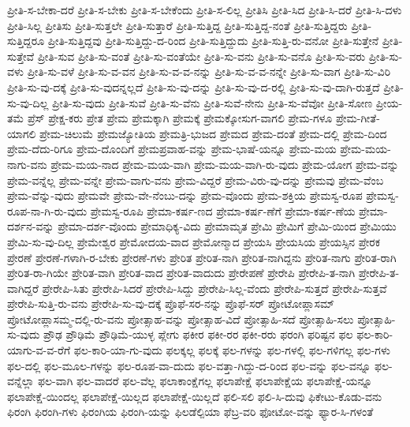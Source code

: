 {ಪ್ರೀತಿ-ಸ-ಬೇಕಾ-ದರೆ
ಪ್ರೀತಿ-ಸ-ಬೇಕು
ಪ್ರೀತಿ-ಸ-ಬೇಕೆಂದು
ಪ್ರೀತಿ-ಸ-ಲಿಲ್ಲ
ಪ್ರೀತಿಸಿ
ಪ್ರೀತಿ-ಸಿದ
ಪ್ರೀತಿ-ಸಿ-ದರೆ
ಪ್ರೀತಿ-ಸಿ-ದಳು
ಪ್ರೀತಿ-ಸಿಲ್ಲ
ಪ್ರೀತಿಸು
ಪ್ರೀತಿ-ಸುತ್ತಲೇ
ಪ್ರೀತಿ-ಸುತ್ತಾರೆ
ಪ್ರೀತಿ-ಸುತ್ತಿದ್ದ
ಪ್ರೀತಿ-ಸುತ್ತಿದ್ದ-ನಂತೆ
ಪ್ರೀತಿ-ಸುತ್ತಿದ್ದರು
ಪ್ರೀತಿ-ಸುತ್ತಿದ್ದರೂ
ಪ್ರೀತಿ-ಸುತ್ತಿದ್ದವು
ಪ್ರೀತಿ-ಸುತ್ತಿದ್ದು-ದ-ರಿಂದ
ಪ್ರೀತಿ-ಸುತ್ತಿದ್ದುದು
ಪ್ರೀತಿ-ಸುತ್ತಿ-ರು-ವನೋ
ಪ್ರೀತಿ-ಸುತ್ತೇನೆ
ಪ್ರೀತಿ-ಸುತ್ತೇವೆ
ಪ್ರೀತಿ-ಸುವ
ಪ್ರೀತಿ-ಸು-ವಂತೆ
ಪ್ರೀತಿ-ಸು-ವಂತೆಯೇ
ಪ್ರೀತಿ-ಸು-ವನು
ಪ್ರೀತಿ-ಸು-ವನೊ
ಪ್ರೀತಿ-ಸು-ವರು
ಪ್ರೀತಿ-ಸು-ವಳು
ಪ್ರೀತಿ-ಸು-ವಳೆ
ಪ್ರೀತಿ-ಸು-ವ-ವನ
ಪ್ರೀತಿ-ಸು-ವ-ವ-ನನ್ನು
ಪ್ರೀತಿ-ಸು-ವ-ವ-ನನ್ನೇ
ಪ್ರೀತಿ-ಸು-ವಾಗ
ಪ್ರೀತಿ-ಸು-ವಿರಿ
ಪ್ರೀತಿ-ಸು-ವು-ದಕ್ಕೆ
ಪ್ರೀತಿ-ಸು-ವುದನ್ನಲ್ಲದೆ
ಪ್ರೀತಿ-ಸು-ವು-ದನ್ನು
ಪ್ರೀತಿ-ಸು-ವು-ದ-ರಲ್ಲಿ
ಪ್ರೀತಿ-ಸು-ವು-ದಾಗಿ-ರುತ್ತದೆ
ಪ್ರೀತಿ-ಸು-ವು-ದಿಲ್ಲ
ಪ್ರೀತಿ-ಸು-ವುದು
ಪ್ರೀತಿ-ಸುವೆ
ಪ್ರೀತಿ-ಸು-ವೆನು
ಪ್ರೀತಿ-ಸುವೆ-ನೇನು
ಪ್ರೀತಿ-ಸು-ವೆವೋ
ಪ್ರೀತಿ-ಸೋಣ
ಪ್ರೀಯ-ತಮೆ
ಪ್ರೆಸ್
ಪ್ರೇಕ್ಷ-ಕರು
ಪ್ರೇತ
ಪ್ರೇಮ
ಪ್ರೇಮಕ್ಕಾಗಿ
ಪ್ರೇಮಕ್ಕೆ
ಪ್ರೇಮಕ್ಕೋಸುಗ-ವಾಗಲಿ
ಪ್ರೇಮ-ಗಳೂ
ಪ್ರೇಮ-ಗೀತೆ-ಯಾಗಲಿ
ಪ್ರೇಮ-ಚಿಲುಮೆ
ಪ್ರೇಮಜ್ಯೋತಿಯ
ಪ್ರೇಮತ್ರಿ-ಭುಜದ
ಪ್ರೇಮದ
ಪ್ರೇಮ-ದಂತೆ
ಪ್ರೇಮ-ದಲ್ಲಿ
ಪ್ರೇಮ-ದಿಂದ
ಪ್ರೇಮ-ದೆದು-ರಿಗೂ
ಪ್ರೇಮ-ದೊಂದಿಗೆ
ಪ್ರೇಮಪ್ರವಾಹ-ವನ್ನು
ಪ್ರೇಮ-ಭಾಷೆ-ಯನ್ನೂ
ಪ್ರೇಮ-ಮಯ
ಪ್ರೇಮ-ಮಯ-ನಾಗು-ವನು
ಪ್ರೇಮ-ಮಯ-ನಾದ
ಪ್ರೇಮ-ಮಯ-ವಾಗಿ
ಪ್ರೇಮ-ಮಯ-ವಾಗಿ-ರು-ವುದು
ಪ್ರೇಮ-ಯೋಗ
ಪ್ರೇಮ-ವನ್ನು
ಪ್ರೇಮ-ವನ್ನೆಲ್ಲ
ಪ್ರೇಮ-ವನ್ನೇ
ಪ್ರೇಮ-ವಾಗು-ವನು
ಪ್ರೇಮ-ವಿದ್ದರೆ
ಪ್ರೇಮ-ವಿರು-ವು-ದನ್ನು
ಪ್ರೇಮವು
ಪ್ರೇಮ-ವೆಂಬ
ಪ್ರೇಮ-ವೆನ್ನು-ವುದು
ಪ್ರೇಮವೇ
ಪ್ರೇಮ-ವೇ-ನೆಂಬು-ದನ್ನು
ಪ್ರೇಮ-ವೊಂದು
ಪ್ರೇಮ-ಶಕ್ತಿಯ
ಪ್ರೇಮಸ್ವ-ರೂಪ
ಪ್ರೇಮಸ್ವ-ರೂಪ-ನಾ-ಗಿ-ರು-ವುದು
ಪ್ರೇಮಸ್ವ-ರೂಪಿ
ಪ್ರೇಮಾ-ಕರ್ಷ-ಣದ
ಪ್ರೇಮಾ-ಕರ್ಷ-ಣೆಗೆ
ಪ್ರೇಮಾ-ಕರ್ಷ-ಣೆಯ
ಪ್ರೇಮಾ-ದರ್ಶನ-ವನ್ನು
ಪ್ರೇಮಾ-ದರ್ಶ-ವೊಂದು
ಪ್ರೇಮಾಧಿಕ್ಯ-ವಿದು
ಪ್ರೇಮಾಮೃತ
ಪ್ರೇಮಿ
ಪ್ರೇಮಿಗೆ
ಪ್ರೇಮಿ-ಯಿಂದ
ಪ್ರೇಮಿಯು
ಪ್ರೇಮಿ-ಸು-ವು-ದಿಲ್ಲ
ಪ್ರೇಮೇಶ್ವರ
ಪ್ರೇಮೋದಯ-ವಾದ
ಪ್ರೇಮೋನ್ಮಾದ
ಪ್ರೇಯಸಿ
ಪ್ರೇಯಸಿಯ
ಪ್ರೇಯಸ್ಸಿನ
ಪ್ರೇರಕ
ಪ್ರೇರಣೆ
ಪ್ರೇರಣೆ-ಗಳಾಗಿ-ರ-ಬೇಕು
ಪ್ರೇರಣೆ-ಗಳು
ಪ್ರೇರಿತ
ಪ್ರೇರಿತ-ನಾಗಿ
ಪ್ರೇರಿತ-ನಾಗಿದ್ದನು
ಪ್ರೇರಿತ-ನಾಗು
ಪ್ರೇರಿತ-ರಾಗಿ
ಪ್ರೇರಿತ-ರಾ-ಗಿಯೇ
ಪ್ರೇರಿತ-ವಾಗಿ
ಪ್ರೇರಿತ-ವಾದ
ಪ್ರೇರಿತ-ವಾದುದು
ಪ್ರೇರೇಪಣೆ
ಪ್ರೇರೇಪಿ
ಪ್ರೇರೇಪಿ-ತ-ನಾಗಿ
ಪ್ರೇರೇಪಿ-ತ-ವಾಗಿದ್ದರೆ
ಪ್ರೇರೇಪಿ-ಸಿತು
ಪ್ರೇರೇಪಿ-ಸಿದರೆ
ಪ್ರೇರೇಪಿ-ಸಿದ್ದು
ಪ್ರೇರೇಪಿ-ಸಿಲ್ಲ-ವೆಂದು
ಪ್ರೇರೇಪಿ-ಸುತ್ತದೆ
ಪ್ರೇರೇಪಿ-ಸುತ್ತವೆ
ಪ್ರೇರೇಪಿ-ಸುತ್ತಿ-ರು-ವನು
ಪ್ರೇರೇಪಿ-ಸು-ವು-ದಕ್ಕೆ
ಪ್ರೊಫೆ-ಸರ-ನನ್ನು
ಪ್ರೊಫೆ-ಸರ್
ಪ್ರೋಟೋಪ್ಲಾಸಮ್
ಪ್ರೋಟೋಪ್ಲಾಸಮ್ಮ-ದಲ್ಲಿ-ರು-ವನು
ಪ್ರೋತ್ಸಾಹ-ವನ್ನು
ಪ್ರೋತ್ಸಾಹ-ವಿದೆ
ಪ್ರೋತ್ಸಾಹಿ-ಸದೆ
ಪ್ರೋತ್ಸಾಹಿ-ಸಲು
ಪ್ರೋತ್ಸಾಹಿ-ಸು-ವುದು
ಪ್ರೌಢ
ಪ್ರೌಢಿಮೆ
ಪ್ರೌಢಿಮೆ-ಯುಳ್ಳ
ಪ್ಲೇಗು
ಫಕೀರ
ಫಕೀ-ರರ
ಫಕೀ-ರರು
ಫರಂಗಿ
ಫರಿಷ್ಟನ
ಫಲ
ಫಲ-ಕಾರಿ-ಯಾಗು-ವ-ವ-ರೆಗೆ
ಫಲ-ಕಾರಿ-ಯಾ-ಗು-ವುದು
ಫಲಕ್ಕಲ್ಲ
ಫಲಕ್ಕೆ
ಫಲ-ಗಳನ್ನು
ಫಲ-ಗಳಲ್ಲಿ
ಫಲ-ಗಳಿಗಲ್ಲ
ಫಲ-ಗಳು
ಫಲ-ದಲ್ಲಿ
ಫಲ-ಮೂಲ-ಗಳನ್ನು
ಫಲ-ರೂಪ-ವಾ-ದುದು
ಫಲ-ವತ್ತಾ-ಗಿದ್ದು-ದ-ರಿಂದ
ಫಲ-ವನ್ನು
ಫಲ-ವನ್ನೂ
ಫಲ-ವನ್ನೆಲ್ಲಾ
ಫಲ-ವಾಗಿ
ಫಲ-ವಾದರೆ
ಫಲ-ವೆಲ್ಲ
ಫಲಾಕಾಂಕ್ಷೆಗಲ್ಲ
ಫಲಾಪೇಕ್ಷೆ
ಫಲಾಪೇಕ್ಷೆಯ
ಫಲಾಪೇಕ್ಷೆ-ಯನ್ನೂ
ಫಲಾಪೇಕ್ಷೆ-ಯಿಂದಲ್ಲ
ಫಲಾಪೇಕ್ಷೆ-ಯಿಲ್ಲದ
ಫಲಾಪೇಕ್ಷೆ-ಯಿಲ್ಲದೆ
ಫಲಿ-ಸಲಿ
ಫಲಿ-ಸಿ-ದುವು
ಫಿಕೇಟು-ಕೊಡು-ವನು
ಫಿರಂಗಿ
ಫಿರಂಗಿ-ಗಳು
ಫಿರಂಗಿಯ
ಫಿರಂಗಿ-ಯನ್ನು
ಫಿಲಡೆಲ್ಪಿಯಾ
ಫೆಬ್ರ-ವರಿ
ಫೋಟೋ-ವನ್ನು
ಫ್ಯಾರ-ಸಿ-ಗಳಂತೆ
}
